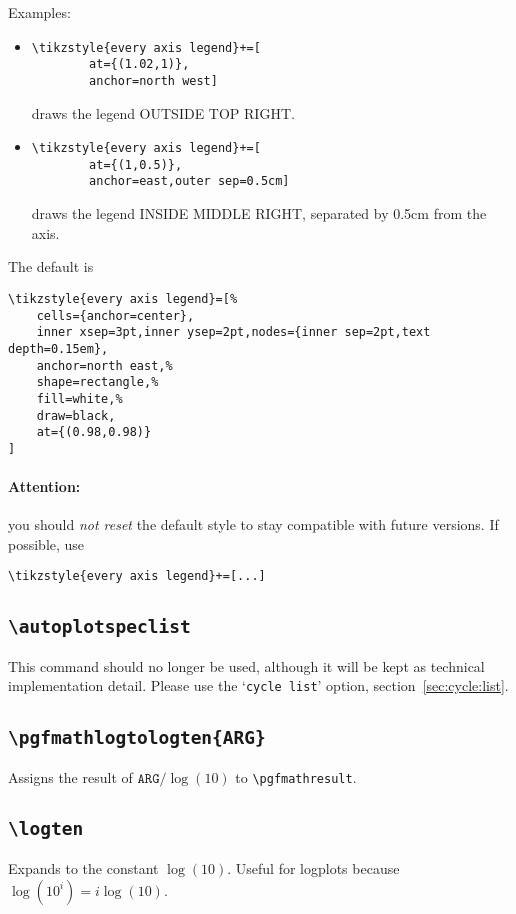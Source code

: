 Examples:
\begin{itemize}
\item 
\begin{lstlisting}
\tikzstyle{every axis legend}+=[
		at={(1.02,1)},
		anchor=north west]
\end{lstlisting}
draws the legend OUTSIDE TOP RIGHT.

\item
\begin{lstlisting}
\tikzstyle{every axis legend}+=[
		at={(1,0.5)},
		anchor=east,outer sep=0.5cm]
\end{lstlisting}
draws the legend INSIDE MIDDLE RIGHT, separated by 0.5cm from the axis.
\end{itemize}

\noindent
The default is
\begin{lstlisting}
\tikzstyle{every axis legend}=[%
	cells={anchor=center},
	inner xsep=3pt,inner ysep=2pt,nodes={inner sep=2pt,text depth=0.15em},
	anchor=north east,%
	shape=rectangle,%
	fill=white,%
	draw=black,
	at={(0.98,0.98)}
]
\end{lstlisting}
\paragraph{Attention:} you should \emph{not reset} the default style to stay compatible with future versions. If possible, use
\begin{lstlisting}
\tikzstyle{every axis legend}+=[...]
\end{lstlisting}


\subsection{\texttt{\textbackslash autoplotspeclist}}
This command should no longer be used, although it will be kept as technical implementation detail. Please use the `\texttt{cycle list}' option, section~\ref{sec:cycle:list}.

\subsection{\texttt{\textbackslash pgfmathlogtologten\{ARG\}}}
Assigns the result of $\texttt{ARG}/\log(10)$ to \lstinline!\pgfmathresult!.

\subsection{\texttt{\textbackslash logten}}
Expands to the constant $\log(10)$. Useful for logplots because $\log(10^i) = i\log(10)$.

